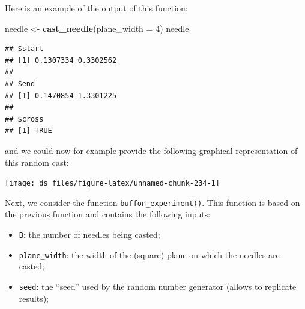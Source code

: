 \documentclass[12pt,]{krantz}
\newenvironment{Shaded}{\begin{snugshade}}{\end{snugshade}}
\newcommand{\KeywordTok}[1]{\textcolor[rgb]{0.27,0.27,0.27}{\textbf{#1}}}
\newcommand{\DataTypeTok}[1]{\textcolor[rgb]{0.27,0.27,0.27}{#1}}
\newcommand{\DecValTok}[1]{\textcolor[rgb]{0.06,0.06,0.06}{#1}}
\newcommand{\StringTok}[1]{\textcolor[rgb]{0.5,0.5,0.5}{#1}}
\newcommand{\OtherTok}[1]{\textcolor[rgb]{0.37,0.37,0.37}{#1}}
\newcommand{\OperatorTok}[1]{\textcolor[rgb]{0.43,0.43,0.43}{\textbf{#1}}}
\newcommand{\NormalTok}[1]{#1}
\providecommand{\tightlist}{%
  \setlength{\itemsep}{0pt}\setlength{\parskip}{0pt}}
\begin{document}
Here is an example of the output of this function:

\begin{Shaded}
\begin{Highlighting}[]
\NormalTok{needle <-}\StringTok{ }\KeywordTok{cast_needle}\NormalTok{(}\DataTypeTok{plane_width =} \DecValTok{4}\NormalTok{)}
\NormalTok{needle}
\end{Highlighting}
\end{Shaded}

\begin{verbatim}
## $start
## [1] 0.1307334 0.3302562
## 
## $end
## [1] 0.1470854 1.3301225
## 
## $cross
## [1] TRUE
\end{verbatim}

and we could now for example provide the following graphical
representation of this random cast:

\begin{Shaded}
\end{Shaded}

\begin{center}\texttt{[image: ds\_files/figure-latex/unnamed-chunk-234-1]} \end{center}

Next, we consider the function \texttt{buffon\_experiment()}. This
function is based on the previous function and contains the following
inputs:

\begin{itemize}
\tightlist
\item
  \texttt{B}: the number of needles being casted;
\item
  \texttt{plane\_width}: the width of the (square) plane on which the
  needles are casted;
\item
  \texttt{seed}: the ``seed'' used by the random number generator
  (allows to replicate results);
\end{itemize}
\end{document}
